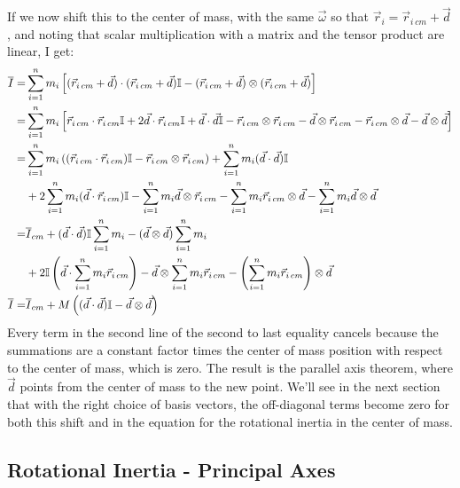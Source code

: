 \documentclass[10pt]{article}
\begin{document}
If we now shift this to the center of mass, with the same $\vec{\omega}$ so 
that $\vec{r}_i = \vec{r}_{i\,cm} + \vec{d}$, and noting that 
scalar multiplication with a matrix and the tensor product are 
linear, I get:
\begin{align}
    \overline{I} = &\sum_{i=1}^n m_i\left[(\vec{r}_{i\,cm}+\vec{d})\cdot
        (\vec{r}_{i\,cm}+\vec{d})\mathbb{I} - (\vec{r}_{i\,cm}+\vec{d})
        \otimes(\vec{r}_{i\,cm}+\vec{d})\right] \notag\\
    =&\sum_{i=1}^n m_i\left[\vec{r}_{i\,cm}\cdot\vec{r}_{i\,cm}\mathbb{I} 
        +2\vec{d}\cdot\vec{r}_{i\,cm}\mathbb{I} +\vec{d}\cdot\vec{d}\mathbb{I} 
        -\vec{r}_{i\,cm}\otimes\vec{r}_{i\,cm} - \vec{d}\otimes\vec{r}_{i\,cm}
        -\vec{r}_{i\,cm}\otimes\vec{d} - \vec{d}\otimes\vec{d} \right] \notag\\
    =&\sum_{i=1}^n m_i
        \left((\vec{r}_{i\,cm}\cdot\vec{r}_{i\,cm})\mathbb{I} 
        -\vec{r}_{i\,cm}\otimes\vec{r}_{i\,cm}\right) +
        \sum_{i=1}^n m_i(\vec{d}\cdot\vec{d})\mathbb{I}\notag\\
        &+2\sum_{i=1}^n m_i(\vec{d}\cdot\vec{r}_{i\,cm})\mathbb{I} 
        -\sum_{i=1}^n m_i\vec{d}\otimes\vec{r}_{i\,cm}
        -\sum_{i=1}^n m_i\vec{r}_{i\,cm}\otimes\vec{d} 
        -\sum_{i=1}^n m_i\vec{d}\otimes\vec{d} \notag\\
    =&\overline{I}_{cm}+ (\vec{d}\cdot\vec{d})\mathbb{I}\sum_{i=1}^n m_i 
        -(\vec{d}\otimes\vec{d})\sum_{i=1}^n m_i\notag\\
    &+2\mathbb{I}\left(\vec{d}\cdot\sum_{i=1}^n m_i\vec{r}_{i\,cm}\right)
        -\vec{d}\otimes\sum_{i=1}^n m_i\vec{r}_{i\,cm}
        -\left(\sum_{i=1}^n m_i\vec{r}_{i\,cm}\right)\otimes\vec{d} \notag\\
    \overline{I}=&\overline{I}_{cm}+ M\left((\vec{d}\cdot\vec{d})\mathbb{I}
        -\vec{d}\otimes\vec{d}\right)
\end{align}
Every term in the second line of the second to last equality cancels 
because the summations are a constant factor times the center of mass 
position with respect to the center of mass, which is zero. The result 
is the parallel axis theorem, where $\vec{d}$ points from the 
center of mass to the new point. We'll see in the next section that 
with the right choice of basis vectors, the off-diagonal terms become zero 
for both this shift and in the equation for the rotational inertia in the 
center of mass.

\subsection{Rotational Inertia - Principal Axes}
\end{document}
